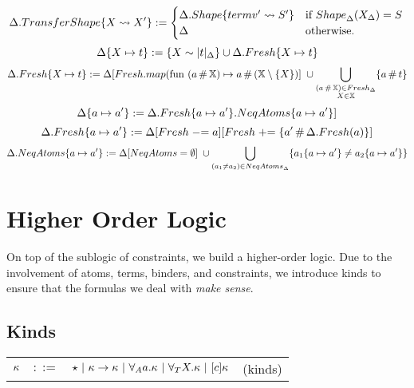 \documentclass[english, mgr]{iithesis}
\begin{document}
$$
\Delta.{TransferShape}\{X \leadsto X'\} :=
  \begin{cases}
    \Delta.{Shape}\{termv' \leadsto  S'\}    &\text{if } {Shape}_{\Delta}( X_{\Delta}) = S \\
    \Delta &\text{otherwise.}\\
  \end{cases} \\
$$
$$
\Delta\{X \mapsto t\} := \{X \sim  |t|_{\Delta} \} \cup \Delta.{Fresh}\{X \mapsto t\}
$$
$$
\Delta.{Fresh}\{X \mapsto t\} :=
 \Delta[{Fresh}.map(\text{fun } (a \,\#\, \mathbb{X}) \mapsto a \,\#\, (\mathbb{X} \setminus \{ X\})] \;
 \cup \bigcup_{\substack{(a \,\#\, \mathbb{X}) \in {Fresh}_{\Delta} \\ X \in \mathbb{X}}}
    \{ a \,\#\, t \}
$$
$$
\Delta\{a \mapsto a'\} := \Delta.{Fresh}\{a \mapsto a'\}.{NeqAtoms}\{a \mapsto a'\}]
$$
$$
\Delta.{Fresh}\{a \mapsto a'\} := \Delta[{Fresh} \mathrel{-}= a][{Fresh} \mathrel{+}= \{a' \,\#\, \Delta.{Fresh}(a)\}]
$$
$$
\Delta.{NeqAtoms}\{a \mapsto a'\} :=
\Delta[{NeqAtoms} = \emptyset] \;
 \cup \bigcup_{ (a_1 \neq a_2) \in {NeqAtoms}_{\Delta}  }
    \{ a_1\{a \mapsto a'\} \neq a_2\{a \mapsto a'\}\}
$$

\chapter{Higher Order Logic}

On top of the sublogic of constraints, we build a higher-order logic.
Due to the involvement of atoms, terms, binders, and constraints,
we introduce kinds to ensure that the formulas we deal with \textit{make sense}.

\section{Kinds}

\begin{tabular}{rclr}
$\kappa$ & $::=$ & $\star
            \ |\  \kappa \to \kappa
            \ |\  \forall_A a . \kappa
            \ |\  \forall_T X . \kappa
            \ |\  [c] \kappa$
    & (kinds)
\end{tabular}
\end{document}
